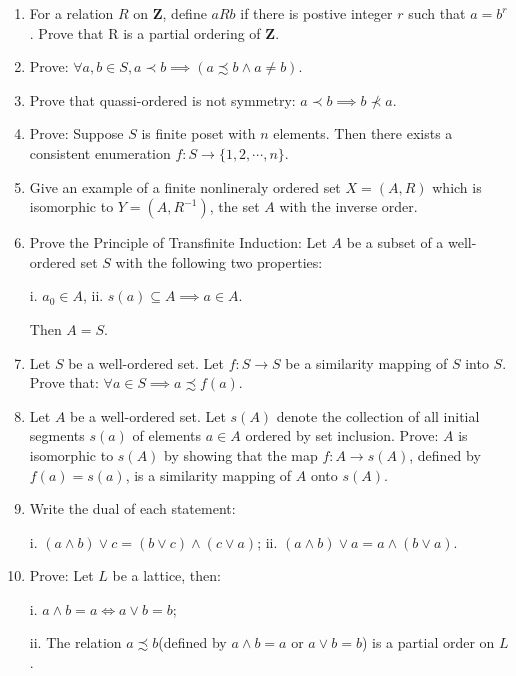 \documentclass{article}
\begin{document}
\begin{enumerate}
  \item For a relation $R$ on $\mathbf{Z}$,
  define $aRb$ if there is postive integer $r$ such that $a = b^r$.
  Prove that R is a partial ordering of $\mathbf{Z}$.

  \item Prove:
  $
  \forall a, b \in S, a\prec b \implies (a\precsim b \land a \neq b)
  $.

  \item Prove that quassi-ordered is not symmetry: $a\prec b \implies b \not\prec a$.

  \item Prove: Suppose $S$ is finite poset with $n$ elements.
  Then there exists a consistent enumeration $f: S\to \{1, 2, \cdots, n\}$.

  \item Give an example of a finite nonlineraly ordered set $X = (A, R)$ which is
  isomorphic to $Y = (A, R^{-1})$, the set $A$ with the inverse order.

  \item Prove the Principle of Transfinite Induction:
  Let $A$ be a subset of a well-ordered set $S$
  with the following two properties:

  i. $a_0 \in A$, ii. $s(a) \subseteq A \implies a \in A$.

  Then $A = S$.

  \item Let $S$ be a well-ordered set. Let $f: S\to S$ be a similarity mapping of $S$ into $S$.
  Prove that: $\forall a \in S \implies a \precsim f(a)$.

  \item Let $A$ be a well-ordered set. Let $s(A)$ denote the collection of
  all initial segments $s(a)$ of elements $a\in A$ ordered by set inclusion.
  Prove: $A$ is isomorphic to $s(A)$ by showing that the map $f: A\to s(A)$,
  defined by $f(a) = s(a)$, is a similarity mapping of $A$ onto $s(A)$.

  \item Write the dual of each statement:

  i. $(a\land b)\lor c = (b\lor c)\land(c\lor a)$;
  ii. $(a\land b)\lor a = a\land(b\lor a)$.

  \item Prove: Let $L$ be a lattice, then:

  i. $a \land b = a \iff a \lor b = b$;

  ii. The relation $a\precsim b$(defined by $a\land b = a$ or $a\lor b = b$)
  is a partial order on $L$.


\end{enumerate}
\end{document}
